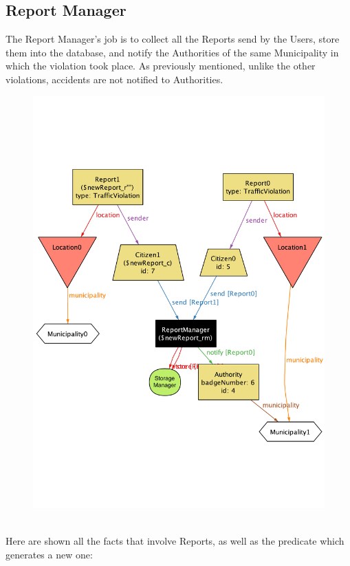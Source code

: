 \documentclass{report}
\begin{document}
\subsection{Report Manager}
The Report Manager's job is to collect all the Reports send by the Users, store them into the database, and notify the Authorities of the same Municipality in which the violation took place. As previously mentioned, unlike the other violations, accidents are not notified to Authorities.
\begin{figure}[ht!]
	\begin{center}
	\includegraphics[width=.75\textwidth]{./img/NewReport.pdf}
	\label{fig:alloyreport}
	\caption{}
	\end{center}
\end{figure}\\
Here are shown all the facts that involve Reports, as well as the predicate which generates a new one:
\end{document}

